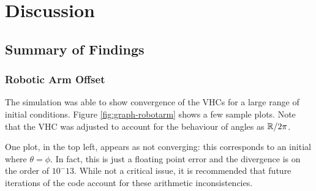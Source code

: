 \documentclass[main.tex]{subfiles}
\begin{document}
\chapter{Discussion}
\section{Summary of Findings}
\subsection{Robotic Arm Offset}
The simulation was able to show convergence of the VHCs for a large range of initial conditions. Figure \ref{fig:graph-robotarm} shows a few sample plots. Note that the VHC was adjusted to account for the behaviour of angles as $\mathbb{R}/2\pi$.

One plot, in the top left, appears as not converging: this corresponds to an initial where $\theta=\phi$. In fact, this is just a floating point error and the divergence is on the order of $10^-13$. While not a critical issue, it is recommended that future iterations of the code account for these arithmetic inconsistencies.
\end{document}
